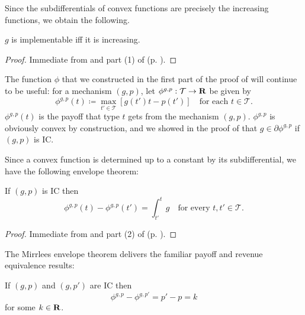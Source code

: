 \documentclass[11pt,letterpaper,reqno,oneside]{article}
\begin{document}
Since the subdifferentials of convex functions are precisely the increasing functions, we obtain the following.
%
\begin{theorem}
	\label{theorem:implementable_monotone_1d}
	$g$ is implementable iff it is increasing.
\end{theorem}

\begin{proof}
	Immediate from  and part (1) of  (p. \pageref{corollary:convex_FTC_1d}).
\end{proof}


The function $\phi$ that we constructed in the first part of the proof of  will continue to be useful: for a mechanism $(g,p)$, let $\phi^{g,p} : \mathcal{T} \to \mathbf{R}$ be given by
%
\begin{equation*}
	\phi^{g,p}(t) \coloneqq \max_{t' \in \mathcal{T}} \left[ g(t') t - p(t') \right]
	\quad \text{for each $t \in \mathcal{T}$} .
\end{equation*}
%
$\phi^{g,p}(t)$ is the payoff that type $t$ gets from the mechanism $(g,p)$. $\phi^{g,p}$ is obviously convex by construction, and we showed in the proof of  that $g \in \partial \phi^{g,p}$ if $(g,p)$ is IC.


Since a convex function is determined up to a constant by its subdifferential, we have the following envelope theorem:
%
\begin{theorem}
	\label{theorem:IC_envelope_1d}
	If $(g,p)$ is IC then
	\begin{equation*}
		\phi^{g,p}(t) - \phi^{g,p}(t') 
		= \int_{t'}^t g
		\quad\text{for every $t,t' \in \mathcal{T}$} .
	\end{equation*}
\end{theorem}

\begin{proof}
	Immediate from  and part (2) of  (p. \pageref{corollary:convex_FTC_1d}).
\end{proof}


The Mirrlees envelope theorem delivers the familiar payoff and revenue equivalence results:
%
\begin{corollary}
	If $(g,p)$ and $(g,p')$ are IC then
	\begin{equation*}
		\phi^{g,p} - \phi^{g,p'} = p'-p = k
	\end{equation*}
	for some $k \in \mathbf{R}$.
\end{corollary}
\end{document}
